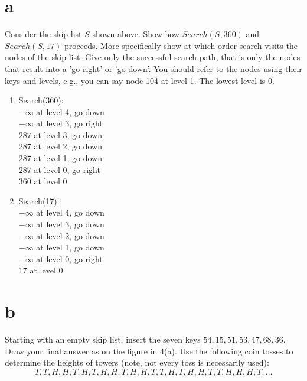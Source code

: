 \documentclass[12pt]{article}
\begin{document}
\begin{enumerate}
\part{a} Consider the skip-list $S$ shown above. Show how $Search(S, 360)$ 
and  $Search(S, 17)$ proceeds. 
More specifically show at which order search visits the nodes of the skip list. 
Give only the successful search path, that is only the nodes that result into a 'go right' or 'go down'.
You should refer to the nodes using their keys and levels, e.g., 
you can say node 104 at level 1. The lowest level is $0$. 

\begin{enumerate}
\item Search(360):\\
$-\infty$ at level 4, go down\\
$-\infty$ at level 3, go right\\
$287$ at level 3, go down\\
287 at level 2, go down\\
287 at level 1, go down\\
287 at level 0, go right\\
360 at level 0\\

\item Search(17):\\
$-\infty$ at level 4, go down\\
$-\infty$ at level 3, go down\\
$-\infty$ at level 2, go down\\
$-\infty$ at level 1, go down\\
$-\infty$ at level 0, go right\\
17 at level 0
\end{enumerate}

\newpage

\part{b} Starting with an empty skip list, insert the seven keys
      $54, 15, 51,53, 47,68,36$.
      Draw your final answer as on the figure in 4(a).
      Use the following coin
      tosses to determine the  heights of towers (note, not every
      toss is necessarily used):
     $$T,T,H,H,T,H,T,H,H,T,H,H,T,T,H,T,H,H,T,T,H,H,H,T,\ldots$$


\end{enumerate}
\end{document}
